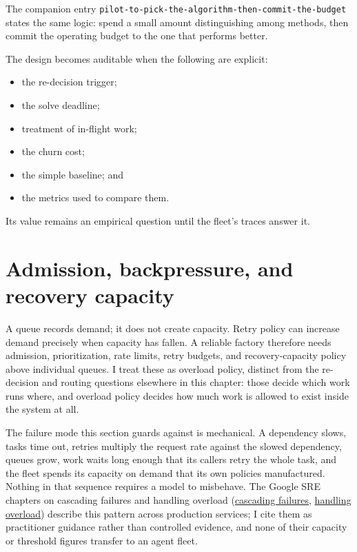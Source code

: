 The companion entry \texttt{pilot-to-pick-the-algorithm-then-commit-the-budget} states the same logic: spend a small amount distinguishing among methods, then commit the operating budget to the one that performs better.


The design becomes auditable when the following are explicit:

\begin{itemize}
\tightlist
\item
  the re-decision trigger;
\item
  the solve deadline;
\item
  treatment of in-flight work;
\item
  the churn cost;
\item
  the simple baseline; and
\item
  the metrics used to compare them.
\end{itemize}

Its value remains an empirical question until the fleet's traces answer it.

\hypertarget{admission-backpressure-and-recovery-capacity}{%
\section{Admission, backpressure, and recovery capacity}\label{admission-backpressure-and-recovery-capacity}}

A queue records demand; it does not create capacity. Retry policy can increase demand precisely when capacity has fallen. A reliable factory therefore needs admission, prioritization, rate limits, retry budgets, and recovery-capacity policy above individual queues. I treat these as overload policy, distinct from the re-decision and routing questions elsewhere in this chapter: those decide which work runs where, and overload policy decides how much work is allowed to exist inside the system at all.

The failure mode this section guards against is mechanical. A dependency slows, tasks time out, retries multiply the request rate against the slowed dependency, queues grow, work waits long enough that its callers retry the whole task, and the fleet spends its capacity on demand that its own policies manufactured. Nothing in that sequence requires a model to misbehave. The Google SRE chapters on cascading failures and handling overload (\href{https://sre.google/sre-book/addressing-cascading-failures/}{cascading failures}, \href{https://sre.google/sre-book/handling-overload/}{handling overload}) describe this pattern across production services; I cite them as practitioner guidance rather than controlled evidence, and none of their capacity or threshold figures transfer to an agent fleet.

